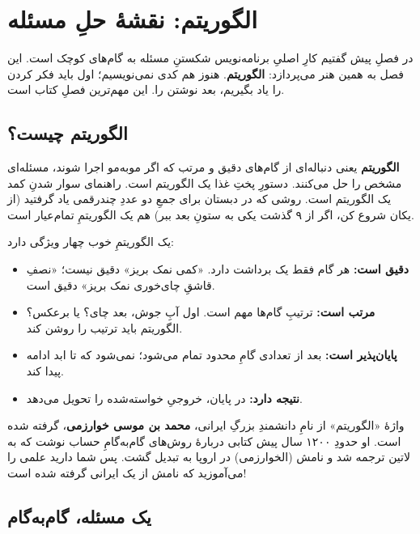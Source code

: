 \chapter{الگوریتم: نقشهٔ حلِ مسئله}%
\label{ch:algorithms}

در فصلِ پیش گفتیم کارِ اصلیِ برنامه‌نویس شکستنِ مسئله به گام‌های کوچک است.
این فصل به همین هنر می‌پردازد: \textbf{الگوریتم}. هنوز هم کدی نمی‌نویسیم؛
اول باید فکر کردن را یاد بگیریم، بعد نوشتن را. این مهم‌ترین فصلِ کتاب است.

\section{الگوریتم چیست؟}

\textbf{الگوریتم} یعنی دنباله‌ای از گام‌های دقیق و مرتب که اگر مو‌به‌مو اجرا
شوند، مسئله‌ای مشخص را حل می‌کنند. دستورِ پختِ غذا یک الگوریتم است. راهنمای
سوار شدنِ کمد یک الگوریتم است. روشی که در دبستان برای جمعِ دو عددِ چندرقمی
یاد گرفتید (از یکان شروع کن، اگر از ۹ گذشت یکی به ستونِ بعد ببر) هم یک
الگوریتمِ تمام‌عیار است.

یک الگوریتمِ خوب چهار ویژگی دارد:

\begin{itemize}
  \item \textbf{دقیق است:} هر گام فقط یک برداشت دارد. «کمی نمک بریز» دقیق
        نیست؛ «نصفِ قاشقِ چای‌خوری نمک بریز» دقیق است.
  \item \textbf{مرتب است:} ترتیبِ گام‌ها مهم است. اول آبِ جوش، بعد چای؟ یا
        برعکس؟ الگوریتم باید ترتیب را روشن کند.
  \item \textbf{پایان‌پذیر است:} بعد از تعدادی گامِ محدود تمام می‌شود؛
        نمی‌شود که تا ابد ادامه پیدا کند.
  \item \textbf{نتیجه دارد:} در پایان، خروجیِ خواسته‌شده را تحویل می‌دهد.
\end{itemize}

\begin{note}
واژهٔ «الگوریتم» از نامِ دانشمندِ بزرگِ ایرانی، \textbf{محمد بن موسی
خوارزمی}، گرفته شده است. او حدودِ ۱۲۰۰ سال پیش کتابی دربارهٔ روش‌های
گام‌به‌گامِ حساب نوشت که به لاتین ترجمه شد و نامش (الخوارزمی) در اروپا به
 تبدیل گشت. پس شما دارید علمی را می‌آموزید که نامش از یک
ایرانی گرفته شده است!
\end{note}

\section{یک مسئله، گام‌به‌گام}

